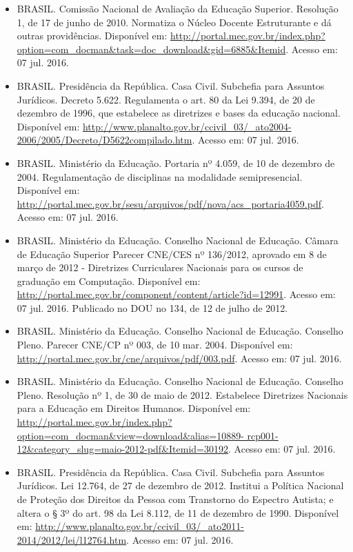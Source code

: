 \begin{itemize}
    \item BRASIL. Comissão Nacional de Avaliação da Educação Superior.
    Resolução 1, de 17 de junho de 2010. Normatiza o Núcleo Docente
    Estruturante e dá outras providências. Disponível em:
    \url{http://portal.mec.gov.br/index.php?option=com_docman&task=doc_download&gid=6885&Itemid}.
    Acesso em: 07 jul. 2016.
    
    \item BRASIL. Presidência da República. Casa Civil. Subchefia para Assuntos
    Jurídicos. Decreto 5.622. Regulamenta o art. 80 da Lei 9.394, de 20 de
    dezembro de 1996, que estabelece as diretrizes e bases da educação
    nacional. Disponível em:
    \url{http://www.planalto.gov.br/ccivil_03/_ato2004-2006/2005/Decreto/D5622compilado.htm}.
    Acesso em: 07 jul. 2016.
    
    \item BRASIL. Ministério da Educação. Portaria nº 4.059, de 10 de dezembro
    de 2004. Regulamentação de disciplinas na modalidade semipresencial.
    Disponível em:
    \url{http://portal.mec.gov.br/sesu/arquivos/pdf/nova/acs_portaria4059.pdf}.
    Acesso em: 07 jul. 2016.
    
    \item BRASIL. Ministério da Educação. Conselho Nacional de Educação. Câmara
    de Educação Superior Parecer CNE/CES nº 136/2012, aprovado em 8 de março de
    2012 - Diretrizes Curriculares Nacionais para os cursos de graduação em
    Computação. Disponível em:
    \url{http://portal.mec.gov.br/component/content/article?id=12991}. Acesso
    em: 07 jul. 2016. Publicado no DOU no 134, de 12 de julho de 2012.
    
    \item BRASIL. Ministério da Educação. Conselho Nacional de Educação.
    Conselho Pleno. Parecer CNE/CP nº 003, de 10 mar. 2004. Disponível em:
    \url{http://portal.mec.gov.br/cne/arquivos/pdf/003.pdf}. Acesso em: 07 jul.
    2016.
    
    \item BRASIL. Ministério da Educação. Conselho Nacional de Educação.
    Conselho Pleno. Resolução nº 1, de 30 de maio de 2012. Estabelece
    Diretrizes Nacionais para a Educação em Direitos Humanos. Disponível em:
    \url{http://portal.mec.gov.br/index.php?option=com_docman&view=download&alias=10889-
    rcp001-12&category_slug=maio-2012-pdf&Itemid=30192}. Acesso em: 07 jul.
    2016.
    
    \item BRASIL. Presidência da República. Casa Civil. Subchefia para Assuntos
    Jurídicos. Lei 12.764, de 27 de dezembro de 2012. Institui a Política
    Nacional de Proteção dos Direitos da Pessoa com Transtorno do Espectro
    Autista; e altera o § 3º do art. 98 da Lei 8.112, de 11 de dezembro de
    1990. Disponível em:
    \url{http://www.planalto.gov.br/ccivil_03/_ato2011-2014/2012/lei/l12764.htm}.
    Acesso em: 07 jul. 2016.
    

\end{itemize}
